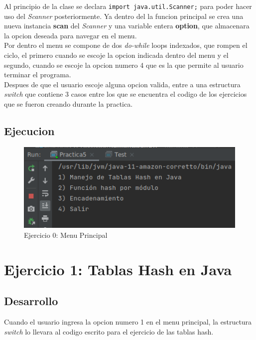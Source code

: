 \documentclass{article}
\begin{document}
			Al principio de la clase se declara \verb|import java.util.Scanner;| para poder hacer uso del \textit{Scanner} posteriormente. Ya dentro del la funcion principal se crea una nueva instancia \textbf{scan} del \textit{Scanner} y una variable entera \textbf{option}, que almacenara la opcion deseada para navegar en el menu.\\
			
			Por dentro el menu se compone de dos \textit{do-while} loops indexados, que rompen el ciclo, el primero cuando se escoje la opcion indicada dentro del menu y el segundo, cuando se escoje la opcion numero 4 que es la que permite al usuario terminar el programa.\\
			
			Despues de que el usuario escoje alguna opcion valida, entre a una estructura \textit{switch} que contiene 3 casos entre los que se encuentra el codigo de los ejercicios que se fueron creando durante la practica.
		
		\subsection{Ejecucion}
		
			\begin{figure}[H]
				\centering
				\includegraphics[scale=0.9]{images/e0.png}
				\caption*{Ejercicio 0: Menu Principal}
			\end{figure}
			
			\newpage
									
	\section{Ejercicio 1: Tablas Hash en Java}
	
		\subsection{Desarrollo}
		
			Cuando el usuario ingresa la opcion numero 1 en el menu principal, la estructura \textit{switch} lo llevara al codigo escrito para el ejercicio de las tablas hash.\\
			
\end{document}
